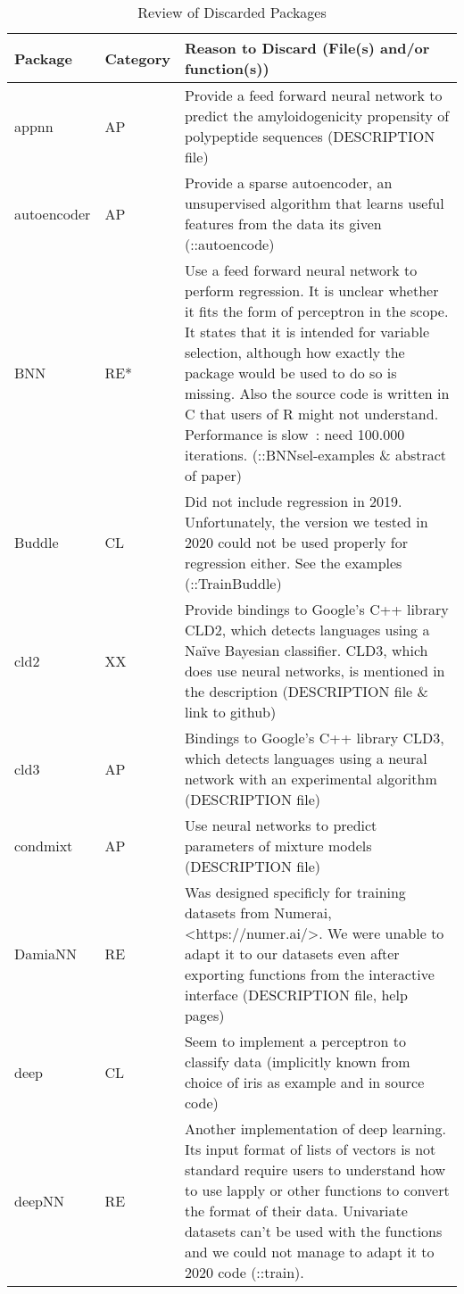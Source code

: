 \begin{Schunk}
\begingroup\fontsize{7}{9}\selectfont

\begin{longtable}[t]{ll>{\raggedright\arraybackslash}p{10cm}}
\caption{\label{tab:unnamed-chunk-3}Review of Discarded Packages}\\
\toprule
Package & Category & Reason to Discard (File(s) and/or function(s))\\
\midrule
appnn & AP & Provide a feed forward neural network to predict the amyloidogenicity propensity of polypeptide sequences (DESCRIPTION file)\\
autoencoder & AP & Provide a sparse autoencoder, an unsupervised algorithm that learns useful features from the data its given (::autoencode)\\
BNN & RE* & Use a feed forward neural network to perform regression. It is unclear whether it fits the form of perceptron in the scope. It states that it is intended for variable selection, although how exactly the package would be used to do so is missing. Also the source code is written in C that users of R might not understand. Performance is slow : need 100.000 iterations. (::BNNsel-examples \& abstract of paper)\\
Buddle & CL & Did not include regression in 2019. Unfortunately, the version we tested in 2020 could not be used properly for regression either. See the examples (::TrainBuddle)\\
cld2 & XX & Provide bindings to Google's C++ library CLD2, which detects languages using a Naïve Bayesian classifier. CLD3, which does use neural networks, is mentioned in the description (DESCRIPTION file \& link to github)\\
\addlinespace
cld3 & AP & Bindings to Google's C++ library CLD3, which detects languages using a neural network with an experimental algorithm (DESCRIPTION file)\\
condmixt & AP & Use neural networks to predict parameters of mixture models (DESCRIPTION file)\\
DamiaNN & RE & Was designed specificly for training datasets from Numerai, <https://numer.ai/>. We were unable to adapt it to our datasets even after exporting functions from the interactive interface (DESCRIPTION file, help pages)\\
deep & CL & Seem to implement a perceptron to classify data (implicitly known from choice of iris as example and in source code)\\
deepNN & RE & Another implementation of deep learning. Its input format of lists of vectors is not standard require users to understand how to use lapply or other functions to convert the format of their data. Univariate datasets can't be used with the functions and we could not manage to adapt it to 2020 code (::train).\\

\end{longtable}
\end{Schunk}
